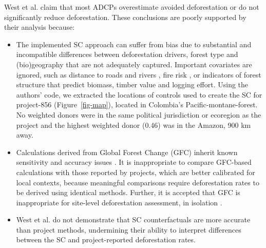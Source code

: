 \documentclass[
  number,
  3p]{elsarticle}
\begin{document}
West et al. \citep{west_action_2023} claim that most ADCPs overestimate
avoided deforestation or do not significantly reduce deforestation.
These conclusions are poorly supported by their analysis because:

\begin{itemize}
\item
  The implemented SC approach can suffer from bias
  \citep{abadie_using_2021} due to substantial and incompatible
  differences between deforestation drivers, forest type and
  (bio)geography that are not adequately captured. Important covariates
  are ignored, such as distance to roads and rivers
  \citep{laurance_roads_2017, barber_roads_2014}, fire risk
  \citep{amador-jimenez_unintended_2020}, or indicators of forest
  structure \citep{duncanson_aboveground_2022} that predict biomass,
  timber value and logging effort. Using the authors' code, we extracted
  the locations of controls used to create the SC for project-856
  (Figure~\ref{fig-map}), located in Colombia's Pacific-montane-forest.
  No weighted donors were in the same political jurisdiction or
  ecoregion as the project and the highest weighted donor (0.46) was in
  the Amazon, 900 km away.
\item
  Calculations derived from Global Forest Change (GFC)
  \citep{hansen_quantification_2010} inherit known sensitivity and
  accuracy issues
  \citep{kinnebrew_biases_2022, galiatsatos_assessment_2020}. It is
  inappropriate to compare GFC-based calculations with those reported by
  projects, which are better calibrated for local contexts, because
  meaningful comparisons require deforestation rates to be derived using
  identical methods. Further, it is accepted that GFC is inappropriate
  for site-level deforestation assessment, in isolation
  \citep{galiatsatos_assessment_2020, bos_global_2019}.
\item
  West et al. \citep{west_action_2023} do not demonstrate that SC
  counterfactuals are more accurate than project methods, undermining
  their ability to interpret differences between the SC and
  project-reported deforestation rates.
\end{itemize}
\end{document}
